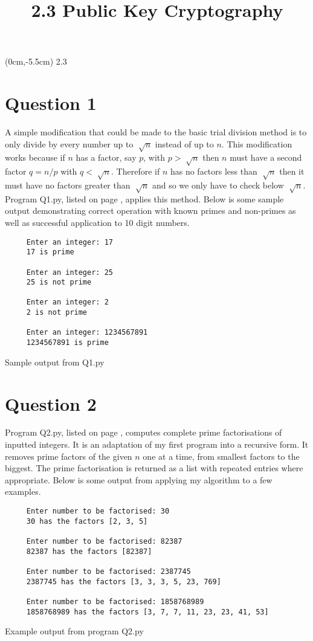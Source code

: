 \documentclass[a4paper]{article}
\title{\vspace*{2cm}2.3 Public Key Cryptography\vspace*{-1.5cm}}
\date{}
\begin{document}
\maketitle

\begin{textblock*}{100mm}(0cm,-5.5cm)
\Huge 2.3
\end{textblock*}

\section*{Question 1}
A simple modification that could be made to the basic trial division method is to only divide by every number up to $\sqrt[]{n}$ instead of up to $n$. This modification works because if $n$ has a factor, say $p$, with $p>\sqrt[]{n}$ then $n$ must have a second factor $q=n/p$ with $q<\sqrt[]{n}$. Therefore if $n$ has no factors less than $\sqrt[]{n}$ then it must have no factors greater than $\sqrt[]{n}$ and so we only have to check below $\sqrt[]{n}$.
\bigbreak
Program Q1.py, listed on page \pageref{PQ1}, applies this method. Below is some sample output demonstrating correct operation with known primes and non-primes as well as successful application to 10 digit numbers.

\begin{table}[H]
\centering
\begin{verbatim}
     Enter an integer: 17
     17 is prime
     
     Enter an integer: 25
     25 is not prime
     
     Enter an integer: 2
     2 is not prime
     
     Enter an integer: 1234567891
     1234567891 is prime
\end{verbatim}
\caption{Sample output from Q1.py}
\end{table}

\section*{Question 2}
Program Q2.py, listed on page \pageref{PQ2}, computes complete prime factorisations of inputted integers. It is an adaptation of my first program into a recursive form. It removes prime factors of the given $n$ one at a time, from smallest factors to the biggest. The prime factorisation is returned as a list with repeated entries where appropriate.
\bigbreak
Below is some output from applying my algorithm to a few examples.
\begin{table}[H]
\centering
\begin{verbatim}
     Enter number to be factorised: 30
     30 has the factors [2, 3, 5]
     
     Enter number to be factorised: 82387
     82387 has the factors [82387]
     
     Enter number to be factorised: 2387745
     2387745 has the factors [3, 3, 3, 5, 23, 769]
     
     Enter number to be factorised: 1858768989
     1858768989 has the factors [3, 7, 7, 11, 23, 23, 41, 53]
\end{verbatim}
\caption{Example output from program Q2.py}
\end{table}
\end{document}
